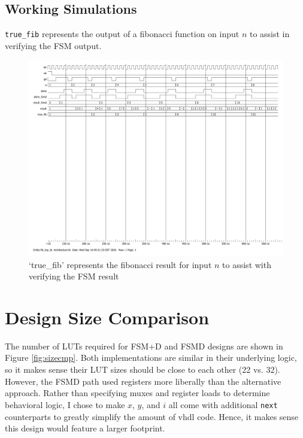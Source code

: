 \documentclass{article}
\begin{document}



\begin{landscape}
\section{Working Simulations}
\texttt{true\_fib} represents the output of a fibonacci function on input $n$ to assist in verifying the FSM output.
\begin{figure}[H]
	\centering
	\includegraphics[width=\linewidth,clip,trim=0cm 15cm 0cm 0cm]{figures/simResults}
	\caption{`true\_fib' represents the fibonacci result for input $n$ to assist with verifying the FSM result}
	\label{fig:fsmplusdtb}
\end{figure}
\end{landscape}

\section{Design Size Comparison}
The number of LUTs required for FSM+D and FSMD designs are shown in Figure \ref{fig:sizecmp}.
Both implementations are similar in their underlying logic, so it makes sense their LUT sizes should be close to each other (22 vs. 32). However, the FSMD path used registers more liberally than the alternative approach. Rather than specifying muxes and register loads to determine behavioral logic, I chose to make $x$, $y$, and $i$ all come with additional \texttt{next} counterparts to greatly simplify the amount of vhdl code. Hence, it makes sense this design would feature a larger footprint.
\end{document}
